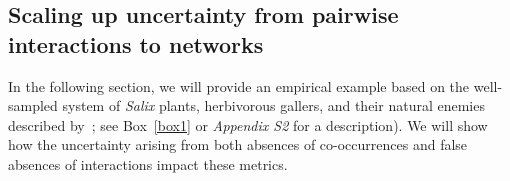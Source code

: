 \documentclass[12pt]{article}
\begin{document}
\begin{spacing}{2.0}
\section*{Scaling up uncertainty from pairwise interactions to networks}

    In the following section, we will provide an empirical example based on the well-sampled system of \emph{Salix}  plants, herbivorous gallers, and their natural enemies described by~\citet{Kopelke2017}; see Box~\ref{box1} or \emph{Appendix S2} for a description). 
    We will show how the uncertainty arising from both absences of co-occurrences and false absences of interactions impact these metrics. %



\end{spacing}
\end{document}

